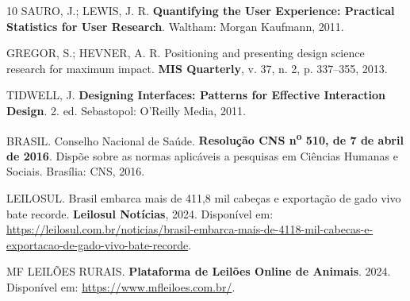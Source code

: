 \documentclass[12pt]{article}
\begin{document}
\begin{thebibliography}{10}
SAURO, J.; LEWIS, J. R.
\textbf{Quantifying the User Experience: Practical Statistics for User Research}.
Waltham: Morgan Kaufmann, 2011.

GREGOR, S.; HEVNER, A. R.
Positioning and presenting design science research for maximum impact.
\textbf{MIS Quarterly}, v. 37, n. 2, p. 337--355, 2013.

TIDWELL, J.
\textbf{Designing Interfaces: Patterns for Effective Interaction Design}.
2. ed. Sebastopol: O'Reilly Media, 2011.

BRASIL. Conselho Nacional de Saúde.
\textbf{Resolução CNS n\textsuperscript{o} 510, de 7 de abril de 2016}.
Dispõe sobre as normas aplicáveis a pesquisas em Ciências Humanas e Sociais.
Brasília: CNS, 2016.

LEILOSUL.
Brasil embarca mais de 411,8 mil cabeças e exportação de gado vivo bate recorde.
\textbf{Leilosul Notícias}, 2024.
Disponível em: \url{https://leilosul.com.br/noticias/brasil-embarca-mais-de-4118-mil-cabecas-e-exportacao-de-gado-vivo-bate-recorde}.

MF LEILÕES RURAIS.
\textbf{Plataforma de Leilões Online de Animais}.
2024.
Disponível em: \url{https://www.mfleiloes.com.br/}.

\end{thebibliography}
\end{document}
